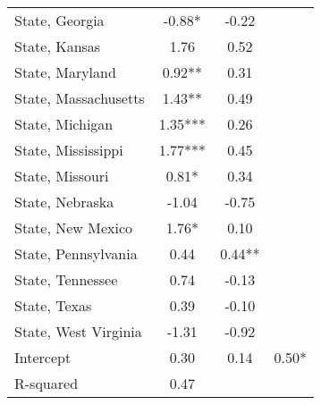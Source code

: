 {\begin{center}
{\begin{longtable}{l*{3}{c}}
            State, Georgia                     & -0.88*                      & -0.22                       &                             \\
            State, Kansas                      & 1.76                        & 0.52                        &                             \\
            State, Maryland                    & 0.92**                      & 0.31                        &                             \\
            State, Massachusetts               & 1.43**                      & 0.49                        &                             \\
            State, Michigan                    & 1.35***                     & 0.26                        &                             \\
            State, Mississippi                 & 1.77***                     & 0.45                        &                             \\
            State, Missouri                    & 0.81*                       & 0.34                        &                             \\
            State, Nebraska                    & -1.04                       & -0.75                       &                             \\
            State, New Mexico                  & 1.76*                       & 0.10                        &                             \\
            State, Pennsylvania                & 0.44                        & 0.44**                      &                             \\
            State, Tennessee                   & 0.74                        & -0.13                       &                             \\
            State, Texas                       & 0.39                        & -0.10                       &                             \\
            State, West Virginia               & -1.31                       & -0.92                       &                             \\
            Intercept                          & 0.30                        & 0.14                        & 0.50*                       \\
            \midrule
            R-squared                          & 0.47                        &                             &                             \\

\end{longtable}}
\end{center}}

